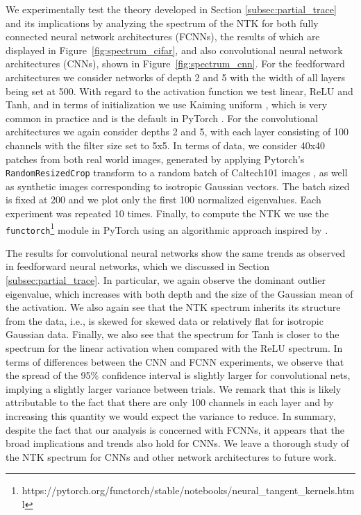 We experimentally test the theory developed in Section \ref{subsec:partial_trace} and its implications by analyzing the spectrum of the NTK for both fully connected neural network architectures (FCNNs), the results of which are displayed in Figure~\ref{fig:spectrum_cifar}, and also convolutional neural network architectures (CNNs), shown in Figure~\ref{fig:spectrum_cnn}. For the feedforward architectures we consider networks of depth 2 and 5 with the width of all layers being set at 500. With regard to the activation function we test linear, ReLU and Tanh, and in terms of initialization we use Kaiming uniform \citep{7410480}, which is very common in practice and is the default in PyTorch \citep{NEURIPS2019_9015}. For the convolutional architectures we again consider depths 2 and 5, with each layer consisting of 100 channels with the filter size set to 5x5. In terms of data, we consider 40x40 patches from both real world images, generated by applying Pytorch's \texttt{RandomResizedCrop} transform to a random batch of Caltech101 images \citep{li_andreeto_ranzato_perona_2022}, as well as synthetic images corresponding to isotropic Gaussian vectors. The batch sized is fixed at 200 and we plot only the first 100 normalized eigenvalues. Each experiment was repeated 10 times. Finally, to compute the NTK we use the \texttt{functorch}\footnote{https://pytorch.org/functorch/stable/notebooks/neural\_tangent\_kernels.html} module in PyTorch using an algorithmic approach inspired by \cite{pmlr-v162-novak22a}. 

The results for convolutional neural networks show the same trends as observed in feedforward neural networks, which we discussed in Section \ref{subsec:partial_trace}. In particular, we again observe the dominant outlier eigenvalue, which increases with both depth and the size of the Gaussian mean of the activation. We also again see that the NTK spectrum inherits its structure from the data, i.e., is skewed for skewed data or relatively flat for isotropic Gaussian data. Finally, we also see that the spectrum for Tanh is closer to the spectrum for the linear activation when compared with the ReLU spectrum. In terms of differences between the CNN and FCNN experiments, we observe that the spread of the 95\% confidence interval is slightly larger for convolutional nets, implying a slightly larger variance between trials. We remark that this is likely attributable to the fact that there are only 100 channels in each layer and by increasing this quantity we would expect the variance to reduce. In summary, despite the fact that our analysis is concerned with FCNNs, it appears that the broad implications and trends also hold for CNNs. We leave a thorough study of the NTK spectrum for CNNs and other network architectures to future work.


